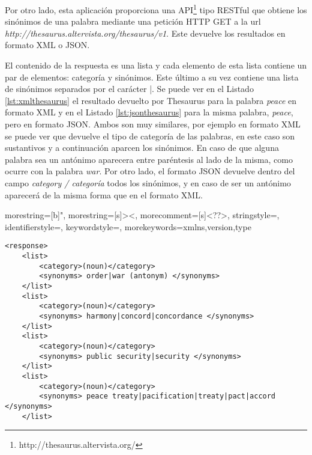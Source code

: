 Por otro lado, esta aplicación proporciona una API\footnote{http://thesaurus.altervista.org/} tipo RESTful que obtiene los sinónimos de una palabra mediante una petición HTTP GET a la url \textit{http://thesaurus.altervista.org/thesaurus/v1}. 
Este devuelve los resultados en formato XML o JSON. 

El contenido de la respuesta es una lista y cada elemento de esta lista contiene un par de elementos: categoría y sinónimos. Este último a su vez contiene una lista de sinónimos separados por el carácter |. 
Se puede ver en el Listado \ref{lst:xmlthesaurus} el resultado devuelto por Thesaurus para la palabra \textit{peace} en formato XML y en el Listado \ref{lst:jsonthesaurus} para la misma palabra, \textit{peace}, pero en formato JSON.
Ambos son muy similares, por ejemplo en formato XML se puede ver que devuelve el tipo de categoría de las palabras, en este caso son sustantivos y a continuación aparcen los sinónimos. En caso de que alguna palabra sea un antónimo aparecera entre paréntesis al lado de la misma, como ocurre con la palabra \textit{war}. Por otro lado, el formato JSON devuelve dentro del campo \textit{category / categoría} todos los sinónimos, y en caso de ser un antónimo aparecerá de la misma forma que en el formato XML.





{
	morestring=[b]",
	morestring=[s]{>}{<},
	morecomment=[s]{<?}{?>},
	stringstyle=\color{black},
	identifierstyle=\color{darkblue},
	keywordstyle=\color{cyan},
	morekeywords={xmlns,version,type}%
}



\lstset{language=XML}
\begin{lstlisting}[caption= XML devuelto por Thesaurus para la palabra \textit{peace}, label={lst:xmlthesaurus}, frame=single]
<response> 
	<list>
		<category>(noun)</category> 
		<synonyms> order|war (antonym) </synonyms>
	</list>
	<list>
		<category>(noun)</category> 
		<synonyms> harmony|concord|concordance </synonyms>
	</list>
	<list>
		<category>(noun)</category> 
		<synonyms> public security|security </synonyms>
	</list>
	<list>
		<category>(noun)</category> 
		<synonyms> peace treaty|pacification|treaty|pact|accord </synonyms>
	</list>
\end{lstlisting}






